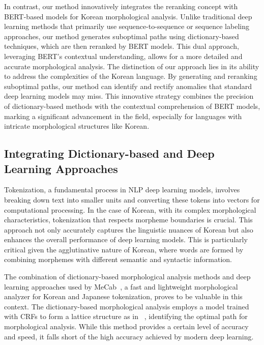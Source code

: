 \documentclass[AMS,STIX2COL]{WileyNJD-v2}
\begin{document}
    In contrast, our method innovatively integrates the reranking concept with BERT-based models for Korean morphological analysis.
    Unlike traditional deep learning methods that primarily use sequence-to-sequence or sequence labeling approaches, our method generates suboptimal paths using dictionary-based techniques, which are then reranked by BERT models.
    This dual approach, leveraging BERT's contextual understanding, allows for a more detailed and accurate morphological analysis.
    The distinction of our approach lies in its ability to address the complexities of the Korean language.
    By generating and reranking suboptimal paths, our method can identify and rectify anomalies that standard deep learning models may miss.
    This innovative strategy combines the precision of dictionary-based methods with the contextual comprehension of BERT models, marking a significant advancement in the field, especially for languages with intricate morphological structures like Korean.

    \subsection{Integrating Dictionary-based and Deep Learning Approaches}\label{subsec:integrating-dictionary-based-and-deep-learning-approaches}
    Tokenization, a fundamental process in NLP deep learning models, involves breaking down text into smaller units and converting these tokens into vectors for computational processing.
    In the case of Korean, with its complex morphological characteristics, tokenization that respects morpheme boundaries is crucial.
    This approach not only accurately captures the linguistic nuances of Korean but also enhances the overall performance of deep learning models.
    This is particularly critical given the agglutinative nature of Korean, where words are formed by combining morphemes with different semantic and syntactic information.

    The combination of dictionary-based morphological analysis methods and deep learning approaches used by MeCab~\cite{MeCab}, a fast and lightweight morphological analyzer for Korean and Japanese tokenization, proves to be valuable in this context.
    The dictionary-based morphological analysis employs a model trained with CRFs to form a lattice structure as in ~\cite{Kudo2004, NaSH2014, NaSH2018}, identifying the optimal path for morphological analysis.
    While this method provides a certain level of accuracy and speed, it falls short of the high accuracy achieved by modern deep learning.
\end{document}
